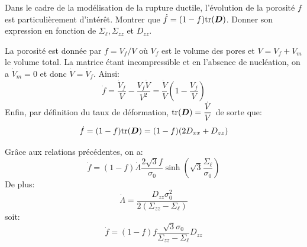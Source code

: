 \documentclass[french,12pt]{exam}
\begin{document}
\begin{questions}
 \question Dans le cadre de la modélisation de la rupture ductile, l'évolution de la porosité $f$ est particulièrement d'intérêt. Montrer que $\dot{f} = (1 - f) \mathrm{tr} (\boldsymbol{D})$. Donner son expression en fonction de $\Sigma_\ell,\Sigma_{zz}$ et $D_{zz}$.
\begin{solution}
La porosité est donnée par $f=V_f/V$ où $V_f$ est le volume des pores et $V=V_f+V_m$ le volume total. La matrice étant incompressible et en l'absence de nucléation, on a $\dot{V}_m=0$ et donc $\dot{V}=\dot{V}_f$. Ainsi:
$$\dot{f} = \dfrac{\dot{V}_f}{V}-\dfrac{V_f\dot{V}}{V^2} = \dfrac{\dot{V}}{V}\left(1-\dfrac{V_f}{V}\right)$$
Enfin, par définition du taux de déformation, $\mathrm{tr}( \boldsymbol{D}) =  \dfrac{\dot{V}}{V}$ de sorte que:
$$\dot{f}=(1-f)\mathrm{tr}(\boldsymbol{D}) = (1-f)(2D_{xx}+D_{zz})$$

Grâce aux relations précédentes, on a:
$$\dot{f} = (1-f)\dot{\Lambda}\dfrac{2\sqrt{3}f}{\sigma_0} \sinh{\left(  \sqrt{3} \frac{\Sigma_\ell}{\sigma_0} \right)} $$
De plus:
$$\dot{\Lambda}= \dfrac{D_{zz}\sigma_0^2}{2(\Sigma_{zz}-\Sigma_\ell)}$$
soit:
$$\dot{f} = (1-f)f\dfrac{\sqrt{3}\sigma_0}{\Sigma_{zz}-\Sigma_\ell}D_{zz}$$
\end{solution}
\end{questions}
\end{document}
